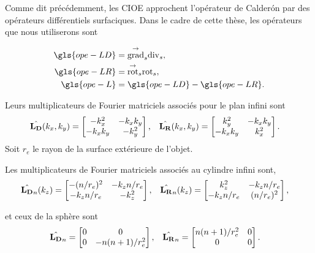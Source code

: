     Comme dit précédemment, les CIOE approchent l'opérateur de Calderón par des opérateurs différentiels surfaciques.
    Dans le cadre de cette thèse, les opérateurs que nous utiliserons sont

    \begin{align*}
      \gls{ope-LD} &= \tgrads \tdivs,
      \\
      \gls{ope-LR} &= \tvrots \trots,
      \\
      \gls{ope-L} &= \gls{ope-LD} - \gls{ope-LR}.
    \end{align*}

    Leurs multiplicateurs de Fourier matriciels associés pour le plan infini sont
    \begin{align*}
      \hat{\mathbf{L_D}}(k_x,k_y) &= \begin{bmatrix}-k_x^2 & -k_xk_y \\ -k_xk_y & -k_y^2\end{bmatrix}, &
      \hat{\mathbf{L_R}}(k_x,k_y) &= \begin{bmatrix}k_y^2 & -k_xk_y \\ -k_xk_y & k_x^2\end{bmatrix}.
    \end{align*}
    Soit \(r_e\) le rayon de la surface extérieure de l'objet.
      
    Les multiplicateurs de Fourier matriciels associés au cylindre infini sont, 
    \begin{align*}
      \hat{\mathbf{L_D}}_n(k_z) &= \begin{bmatrix}-(n/r_e)^2 & -k_zn/r_e \\ -k_zn/r_e &-k_z^2\end{bmatrix},
      &
      \hat{\mathbf{L_R}}_n(k_z) &= \begin{bmatrix}k_z^2 & -k_zn/r_e \\ -k_zn/r_e & (n/r_e)^2\end{bmatrix},
    \end{align*}

    et ceux de la sphère sont
    \begin{align*}
      \hat{\mathbf{L_D}}_n &= \begin{bmatrix}0 & 0 \\ 0 &-n(n+1)/ r_e^2\end{bmatrix},
      &
      \hat{\mathbf{L_R}}_n &= \begin{bmatrix}n(n+1)/ r_e^2 &0 \\ 0 & 0\end{bmatrix}.
    \end{align*}

